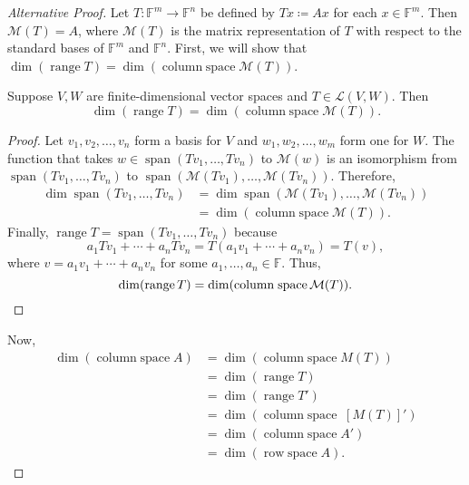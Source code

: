 \documentclass{article}
\begin{document}
\begin{proof}[Alternative Proof]
	Let \(T:\mathbb{F}^m\to \mathbb{F}^n\) be defined by \(Tx \coloneqq Ax\) for
	each \(x\in \mathbb{F}^m\).  Then \(\mathcal{M}(T) = A\), where
	\(\mathcal{M}(T)\) is the matrix representation of \(T\) with respect to the
	standard bases of \(\mathbb{F}^m\) and \(\mathbb{F}^n\).  First, we will show
	that \(\dim (\operatorname{range} T) = \dim (\operatorname{column\;space}
	\mathcal{M}(T))\).
	\begin{lemma}
		Suppose \(V, W\) are finite-dimensional vector spaces and \(T\in
		\mathcal{L}(V,W)\).  Then
		\[
			\dim (\operatorname{range} T) = \dim (\operatorname{column\;space}
			\mathcal{M}(T))
			.\]
	\end{lemma}
	\begin{proof}
		Let \(v_1, v_2, \ldots, v_n\) form a basis for \(V\) and \(w_1, w_2,
		\ldots, w_m\) form one for \(W\).  The function that takes \(w\in
		\operatorname{span}(Tv_1, \ldots, Tv_n)\) to \(\mathcal{M}(w)\) is an
		isomorphism from \(\operatorname{span}(Tv_1, \ldots, Tv_n)\) to
		\(\operatorname{span}(\mathcal{M}(Tv_1), \ldots, \mathcal{M}(Tv_n))\).
		Therefore,
		\begin{align*}
			\dim \operatorname{span}(Tv_1, \ldots, Tv_n) & = \dim \operatorname{span}(\mathcal{M}(Tv_1), \ldots, \mathcal{M}(Tv_n)) \\
			                                             & = \dim (\operatorname{column\;space} \mathcal{M}(T))
			.\end{align*}
		Finally, \(\operatorname{range} T = \operatorname{span}(Tv_1, \ldots,
		Tv_n)\) because
		\[
			a_1 Tv_1 + \cdots + a_n Tv_n = T (a_1v_1 + \cdots + a_nv_n) = T(v)
			,\]
		where \(v = a_1v_1 + \cdots + a_nv_n\) for some \(a_1, \ldots, a_n\in
		\mathbb{F}\).  Thus,
		\[
			\dim (\operatorname{range} T) = \dim (\operatorname{column\;space}
			\mathcal{M}(T))
			.\qedhere\]
	\end{proof}

	Now,
	\begin{align*}
		\dim (\operatorname{column\;space} A) & = \dim (\operatorname{column\;space} M(T))      \\
		                                      & = \dim (\operatorname{range} T)                 \\
		                                      & = \dim (\operatorname{range} T')                \\
		                                      & = \dim (\operatorname{column\;space}\; [M(T)]') \\
		                                      & = \dim (\operatorname{column\;space} A')        \\
		                                      & = \dim (\operatorname{row\;space} A)
		.\end{align*}
\end{proof}
\end{document}
